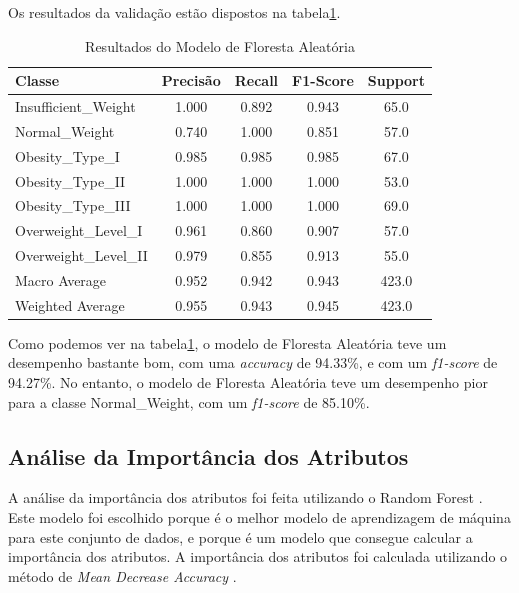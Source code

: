 \documentclass{easychair}
\begin{document}
Os resultados da validação estão dispostos na tabela\ref{tab:random-forest-results}.


\begin{table}[ht]
  \centering
  \begin{tabular}{l c c c c}
  \toprule
  Classe                & Precisão  & Recall & F1-Score & Support \\
  \midrule
  Insufficient\_Weight  & 1.000     & 0.892  & 0.943    & 65.0    \\
  Normal\_Weight        & 0.740     & 1.000  & 0.851    & 57.0    \\
  Obesity\_Type\_I      & 0.985     & 0.985  & 0.985    & 67.0    \\
  Obesity\_Type\_II     & 1.000     & 1.000  & 1.000    & 53.0    \\
  Obesity\_Type\_III    & 1.000     & 1.000  & 1.000    & 69.0    \\
  Overweight\_Level\_I  & 0.961     & 0.860  & 0.907    & 57.0    \\
  Overweight\_Level\_II & 0.979     & 0.855  & 0.913    & 55.0    \\
  \midrule
  Macro Average         & 0.952     & 0.942  & 0.943    & 423.0   \\
  Weighted Average      & 0.955     & 0.943  & 0.945    & 423.0   \\
  \bottomrule
  \end{tabular}
  \caption{Resultados do Modelo de Floresta Aleatória}
  \label{tab:random-forest-results}
\end{table}

Como podemos ver na tabela\ref{tab:random-forest-results}, o modelo de Floresta Aleatória teve um desempenho bastante bom, com uma \textit{accuracy} de 94.33\%, e com um \textit{f1-score} de 94.27\%. No entanto, o modelo de Floresta Aleatória teve um desempenho pior para a classe Normal\_Weight, com um \textit{f1-score} de 85.10\%.

\subsection{Análise da Importância dos Atributos}

A análise da importância dos atributos foi feita utilizando o Random Forest \cite{random-forest}. Este modelo foi escolhido porque é o melhor modelo de aprendizagem de máquina para este conjunto de dados, e porque é um modelo que consegue calcular a importância dos atributos. A importância dos atributos foi calculada utilizando o método de \textit{Mean Decrease Accuracy} \cite{mean-decrease-accuracy}.
\end{document}
